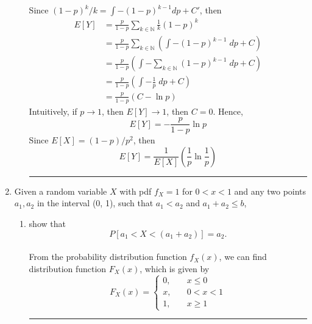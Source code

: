 \documentclass[twoside]{article}
\theoremstyle{definition}
\theoremstyle{remark}
\newenvironment{sol}{{\bf Solution:}}{\hfill\rule{2mm}{2mm}}
\begin{document}
\begin{enumerate}
\begin{enumerate}
\begin{sol}
\begin{equation}
      \end{equation}
      Since ${(1-p)}^k/k = \int -{(1-p)}^{k-1} dp + C'$, then
      \begin{equation}
        \begin{split}
          E[Y]
          &= \frac{p}{1-p} \sum_{k \in \mathbb{N}} \frac{1}{k} {(1-p)}^k \\
          &= \frac{p}{1-p} \sum_{k \in \mathbb{N}} \left( \int - {(1-p)}^{k-1} \;dp + C \right) \\
          &= \frac{p}{1-p} \left( \int - \sum_{k \in \mathbb{N}} {(1-p)}^{k-1} \;dp + C \right) \\
          &= \frac{p}{1-p} \left( \int - \frac{1}{p}\; dp + C \right) \\
          &= \frac{p}{1-p} \left( C - \ln p \right)
        \end{split}
      \end{equation}
      Intuitively, if $p \rightarrow 1$, then $E[Y] \rightarrow 1$, then $C = 0$.
      Hence,
      \begin{equation}
        E[Y] = - \frac{p}{1-p} \ln p
      \end{equation}
      Since $E[X] = (1-p)/p^2$, then
      \begin{equation}
        E[Y] = \frac{1}{E[X]} \left( \frac{1}{p} \ln \frac{1}{p} \right)
      \end{equation}
    \end{sol}
  \end{enumerate}
  \clearpage
  \item Given a random variable $X$ with pdf $f_X = 1$ for $0 < x < 1$ and any
  two points $a_1, a_2$ in the interval (0, 1), such that $a_1 < a_2$ and $a_1 +
  a_2 \leq b$,
  \begin{enumerate}
    \item show that
    \begin{equation*}
      P[a_1 < X < (a_1 + a_2)] = a_2.
    \end{equation*}
    \begin{sol}\\
      From the probability distribution function $f_X(x)$, we can find distribution
      function $F_X(x)$, which is given by
      \begin{equation}
        F_X(x) =
        \left\{
        \begin{array}{lr}
          0, \quad & x \leq 0 \\
          x, \quad & 0 < x < 1 \\
          1, \quad & x \geq 1

\end{array}
\end{equation}
\end{sol}
\end{enumerate}
\end{enumerate}
\end{document}
